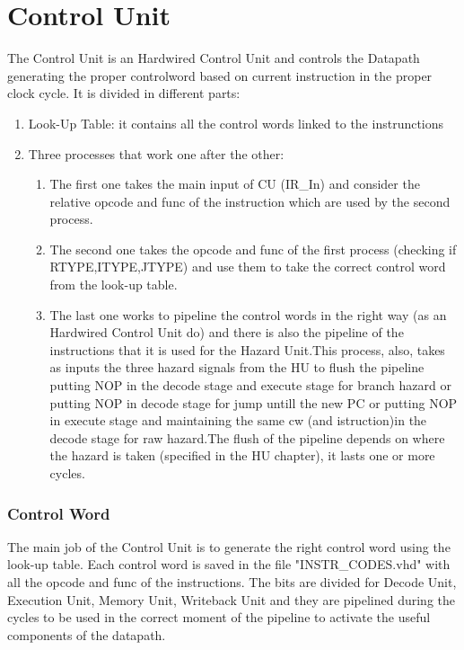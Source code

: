 \chapter{Control Unit}
\label{Control Unit}
The Control Unit is an Hardwired Control Unit and controls the Datapath generating the proper controlword based on current instruction in the proper clock cycle. It is divided in different parts:

\begin{enumerate} 
    \item Look-Up Table: it contains all the control words linked to the instrunctions
    \item Three processes that work one after the other:
    \begin{enumerate}
    \item The first one takes the main input of CU (IR\_In) and consider the relative opcode and func of the instruction which are used by the second process.
    \item The second one takes the opcode and func of the first process (checking if RTYPE,ITYPE,JTYPE) and use them to take the correct control word from the look-up table.
    \item The last one works to pipeline the control words in the right way (as an Hardwired Control Unit do) and there is also the pipeline of the instructions that it is used for the Hazard Unit.This process, also, takes as inputs the three hazard signals from the HU to flush the pipeline putting NOP in the decode stage and execute stage for branch hazard or putting NOP in decode stage for jump untill the new PC or putting NOP in execute stage and maintaining the same cw (and istruction)in the decode stage for raw hazard.The flush of the pipeline depends on where the hazard is taken (specified in the HU chapter), it lasts one or more cycles. 
    \end{enumerate}
\end{enumerate}
\subsection{Control Word}
The main job of the Control Unit is to generate the right control word using the look-up table. Each control word is saved in the file "INSTR\_CODES.vhd" with all the opcode and func of the instructions.
The bits are divided for Decode Unit, Execution Unit, Memory Unit, Writeback Unit and they are pipelined during the cycles to be used in the correct moment of the pipeline to activate the useful components of the datapath.

